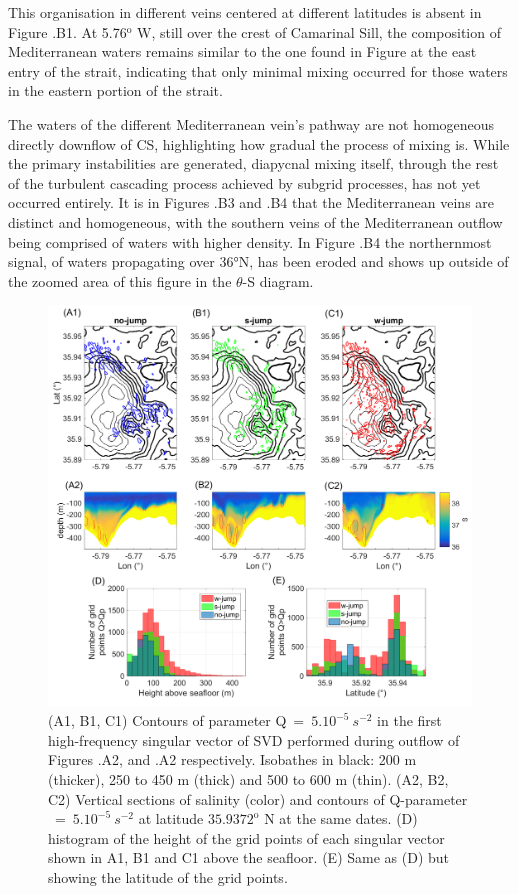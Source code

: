 This organisation in different veins centered at different latitudes is absent in Figure .B1. At 5.76$^{\text{o}}$ W, still over the crest of Camarinal Sill, the composition of Mediterranean waters remains similar to the one found in Figure  at the east entry of the strait, indicating that only minimal mixing occurred for those waters in the eastern portion of the strait.

The waters of the different Mediterranean vein's pathway are not homogeneous directly downflow of CS, highlighting how gradual the process of mixing is. While the primary instabilities are generated, diapycnal mixing itself, through the rest of the turbulent cascading process achieved by subgrid processes, has not yet occurred entirely. It is in Figures .B3 and .B4 that the Mediterranean veins are distinct and homogeneous, with the southern veins of the Mediterranean outflow being comprised of waters with higher density. In Figure .B4 the northernmost signal, of waters propagating  over 36°N, has been eroded and shows up outside of the zoomed area of this figure in the $\theta$-S diagram. 

\begin{figure}[!h]
 \includegraphics[width=\textwidth]{./GBR3D/EOF5_MIV_2D.png}
 \caption[SVD of parameter Q across simulations SimNT, SimIT and SimST.]{(A1, B1, C1) Contours of parameter Q$\ =\ 5.10^{-5} \ s^{-2}$ in the first high-frequency singular vector of SVD performed during outflow of Figures .A2, and .A2 respectively. Isobathes in black: 200 m (thicker), 250 to 450 m (thick) and 500 to 600 m (thin). (A2, B2, C2) Vertical sections of salinity (color) and contours of Q-parameter $\ =\ 5.10^{-5}\ s^{-2}$ at latitude $35.9372^\text{o}$ N at the same dates. (D) histogram of the height of the grid points of each singular vector shown in A1, B1 and C1 above the seafloor. (E) Same as (D) but showing the latitude of the grid points.}
 \label{FigEOFMIV}
\end{figure}


